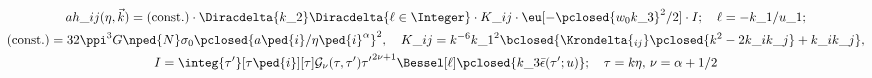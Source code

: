 \section{}

\begin{multline}
    ah\_{ij}(\eta, \vec{k}) = \text{(const.)} \cdot  \Diracdelta{k\_2} \Diracdelta{\ell\in \Integer} \cdot K\_{ij}\cdot \eu[-\pclosed{w_0 k\_3}^2/2] \cdot I; \quad \ell = -k\_1 /u\_1 ; \\
    \text{(const.)}= 32\ppi^3 G\nped{N} \sigma_0 {\pclosed{a\ped{i}/\eta\ped{i}^\alpha}}^2,\quad
    K\_{ij} = k^{-6} {k\_1}^2 \bclosed{ \Krondelta{_{ij}} \pclosed{k^2-2k\_i k\_j} + k\_i k\_j},\\
    I = \integ{\tau'}[\tau\ped{i}][\tau] \mathcal{G}_{\nu}(\tau, \tau') {\tau'}^{2\nu+1} \Bessel[\ell]\pclosed{k\_3 \bar{\epsilon}(\tau'; u)};\quad \tau=k\eta, \, \nu = \alpha+1/2
\end{multline}